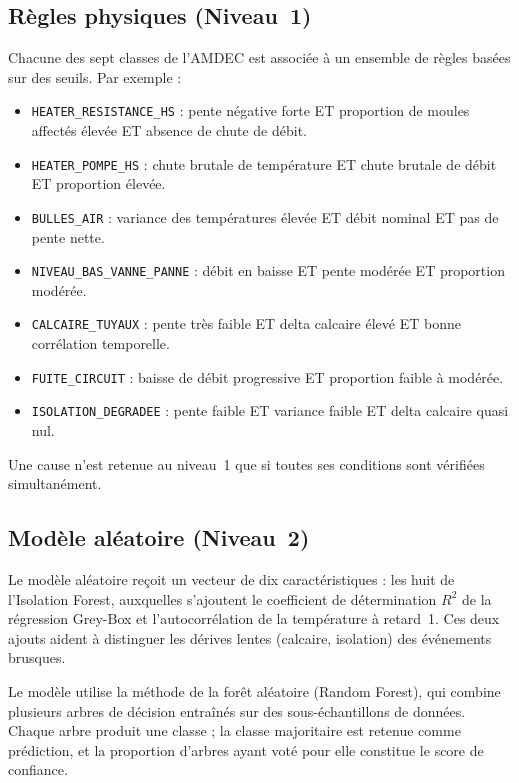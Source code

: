 \subsection{Règles physiques (Niveau~1)}

Chacune des sept classes de l'AMDEC est associée à un ensemble de règles basées sur des seuils. Par exemple :

\begin{itemize}
  \item \texttt{HEATER\_RESISTANCE\_HS} : pente négative forte ET proportion de moules affectés élevée ET absence de chute de débit.
  \item \texttt{HEATER\_POMPE\_HS} : chute brutale de température ET chute brutale de débit ET proportion élevée.
  \item \texttt{BULLES\_AIR} : variance des températures élevée ET débit nominal ET pas de pente nette.
  \item \texttt{NIVEAU\_BAS\_VANNE\_PANNE} : débit en baisse ET pente modérée ET proportion modérée.
  \item \texttt{CALCAIRE\_TUYAUX} : pente très faible ET delta calcaire élevé ET bonne corrélation temporelle.
  \item \texttt{FUITE\_CIRCUIT} : baisse de débit progressive ET proportion faible à modérée.
  \item \texttt{ISOLATION\_DEGRADEE} : pente faible ET variance faible ET delta calcaire quasi nul.
\end{itemize}

Une cause n'est retenue au niveau~1 que si toutes ses conditions sont vérifiées simultanément.

\subsection{Modèle aléatoire (Niveau~2)}

Le modèle aléatoire reçoit un vecteur de dix caractéristiques : les huit de l'Isolation Forest, auxquelles s'ajoutent le coefficient de détermination \(R^2\) de la régression Grey-Box et l'autocorrélation de la température à retard~1. Ces deux ajouts aident à distinguer les dérives lentes (calcaire, isolation) des événements brusques.

Le modèle utilise la méthode de la forêt aléatoire (Random Forest), qui combine plusieurs arbres de décision entraînés sur des sous-échantillons de données. Chaque arbre produit une classe ; la classe majoritaire est retenue comme prédiction, et la proportion d'arbres ayant voté pour elle constitue le score de confiance.

